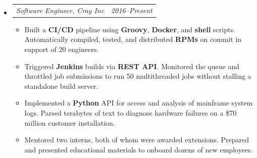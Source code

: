 \documentclass[12pt,letterpaper]{article}
\makeatletter
\newcommand{\headerpair}[2]{
    \begin{tabular*}{\linewidth}{l@{ \extracolsep{\fill} }r} {\large\emph{#1}} & {\large\emph{#2}}
    \end{tabular*}
}
\newcommand{\headerrow}[3]{\headerpair{#1, #2}{#3}}
\newcommand{\YearRange}[2]{#1--#2}
\makeatother
\begin{document}
\begin{itemize}[leftmargin=\parindent]
    \parskip=0.1em
    \itemsep=1.2em
    \item[]
        \headerrow
            {Software Engineer}
            {Cray Inc}
            {\YearRange{2016}{Present}}
        \begin{itemize}[leftmargin=\parindent]
            \item Built a \textbf{CI/CD} pipeline using \textbf{Groovy}, \textbf{Docker}, and \textbf{shell} scripts. Automatically compiled, tested, and distributed \textbf{RPMs} on commit in support of 20 engineers.
            \item Triggered \textbf{Jenkins} builds via \textbf{REST API}. Monitored the queue and throttled job submissions to run 50 multithreaded jobs without stalling a standalone build server.
            \item Implemented a \textbf{Python} API for access and analysis of mainframe system logs. Parsed terabytes of text to diagnose hardware failures on a \$70 million customer installation.
            \item Mentored two interns, both of whom were awarded extensions. Prepared and presented educational materials to onboard dozens of new employees.
        \end{itemize}

\end{itemize}
\end{document}
